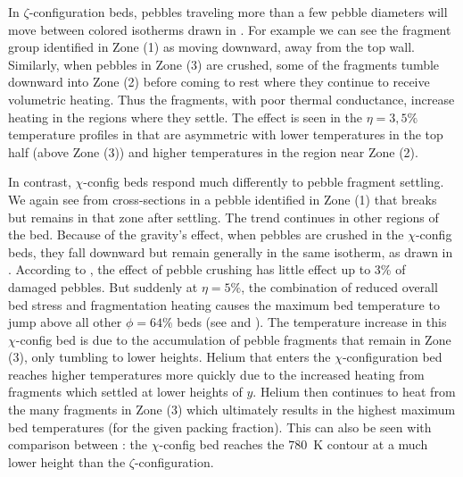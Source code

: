 In $\zeta$-configuration beds, pebbles traveling more than a few pebble diameters will move between colored isotherms drawn in . For example we can see the fragment group identified in Zone (1) as moving downward, away from the top wall. Similarly, when pebbles in Zone (3) are crushed, some of the fragments tumble downward into Zone (2) before coming to rest where they continue to receive volumetric heating. Thus the fragments, with poor thermal conductance, increase heating in the regions where they settle. The effect is seen in the $\eta = 3, 5\%$ temperature profiles in  that are asymmetric with lower temperatures in the top half (above Zone (3)) and higher temperatures in the region near Zone (2).

In contrast, $\chi$-config beds respond much differently to pebble fragment settling. We again see from cross-sections in  a pebble identified in Zone (1) that breaks but remains in that zone after settling. The trend continues in other regions of the bed. Because of the gravity's effect, when pebbles are crushed in the $\chi$-config beds, they fall downward but remain generally in the same isotherm, as drawn in . According to , the effect of pebble crushing has little effect up to 3\% of damaged pebbles. But suddenly at $\eta = 5\%$, the combination of reduced overall bed stress and fragmentation heating causes the maximum bed temperature to jump above all other $\phi = 64\%$ beds (see  and ). The temperature increase in this $\chi$-config bed is due to the accumulation of pebble fragments that remain in Zone (3), only tumbling to lower heights. Helium that enters the $\chi$-configuration bed reaches higher temperatures more quickly due to the increased heating from fragments which settled at lower heights of $y$. Helium then continues to heat from the many fragments in Zone (3) which ultimately results in the highest maximum bed temperatures (for the given packing fraction). This can also be seen with comparison between : the $\chi$-config bed reaches the $780$~\si{\kelvin} contour at a much lower height than the $\zeta$-configuration. 



